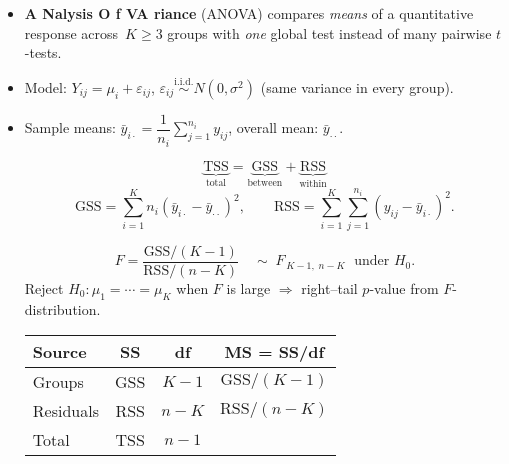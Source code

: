\documentclass[12pt]{book}
\begin{document}
\begin{itemize}
  \setlength{\itemsep}{6pt}  %

  \item \textbf{A Nalysis O f VA riance} (ANOVA) compares \emph{means} of a
        quantitative response across \(\,K\ge 3\) groups with \emph{one} global test
        instead of many pairwise \(t\)-tests.

  \item Model: \(Y_{ij}=\mu_{i}+\varepsilon_{ij}\),\;
        \(\varepsilon_{ij}\stackrel{\text{i.i.d.}}{\sim}N(0,\sigma^{2})\)
        (same variance in every group).

  \item Sample means: \(\bar{y}_{i\cdot}=\dfrac{1}{n_{i}}\sum_{j=1}^{n_{i}}y_{ij}\),
        \quad overall mean: \(\bar{y}_{\cdot\!\cdot}\).

  \[
    \underbrace{\text{TSS}}_{\text{total}}
    =\underbrace{\text{GSS}}_{\text{between}}
    +\underbrace{\text{RSS}}_{\text{within}}
  \]
  \[
    \text{GSS}=\sum_{i=1}^{K} n_{i}(\bar{y}_{i\cdot}-\bar{y}_{\cdot\!\cdot})^{2},
    \qquad
    \text{RSS}=\sum_{i=1}^{K}\sum_{j=1}^{n_{i}}(y_{ij}-\bar{y}_{i\cdot})^{2}.
  \]

  \[
    F=\frac{\text{GSS}/(K-1)}{\text{RSS}/(n-K)}
    \quad\sim\;F_{\,K-1,\;n-K}\;\text{ under }H_{0}.
  \]
  Reject \(H_{0}:\mu_{1}=\cdots=\mu_{K}\) when \(F\) is large
  \(\Rightarrow\) right–tail \(p\)-value from \(F\)-distribution.

\begin{center}
\begin{tabular}{lccc}
\hline
Source       & SS  & df          & MS = SS/df \\ \hline
Groups       & GSS & \(K-1\)     & \(\text{GSS}/(K-1)\) \\
Residuals    & RSS & \(n-K\)     & \(\text{RSS}/(n-K)\) \\ \hline
Total        & TSS & \(n-1\)     &                \\ \hline
\end{tabular}
\end{center}


\end{itemize}
\end{document}
